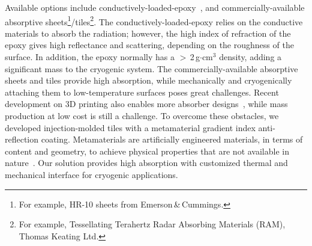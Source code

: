 Available options include conductively-loaded-epoxy~\citep{Wollack2008}, and commercially-available absorptive sheets\footnote{For example, HR-10 sheets from Emerson\,\&\,Cummings.}/tiles\footnote{For example, Tessellating Terahertz Radar Absorbing Materials (RAM), Thomas Keating Ltd.}. The conductively-loaded-epoxy relies on the conductive materials to absorb the radiation; however, the high index of refraction of the epoxy gives high reflectance and scattering, depending on the roughness of the surface. In addition, the epoxy normally has a $>$\,2\,g$\cdot$cm$^3$ density, adding a significant mass to the cryogenic system. The commercially-available absorptive sheets and tiles provide high absorption, while mechanically and cryogenically attaching them to low-temperature surfaces poses great challenges. Recent development on 3D printing also enables more absorber designs~\cite{petroff/etal:2019}, while mass production at low cost is still a challenge. To overcome these obstacles, we developed injection-molded tiles with a metamaterial gradient index anti-reflection coating. Metamaterials are artificially engineered materials, in terms of content and geometry, to achieve physical properties that are not available in nature~\cite{wollack/etal:2016, ding/etal:2012, watts/liu/padilla:2012}. Our solution provides high absorption with customized thermal and mechanical interface for cryogenic applications. 

